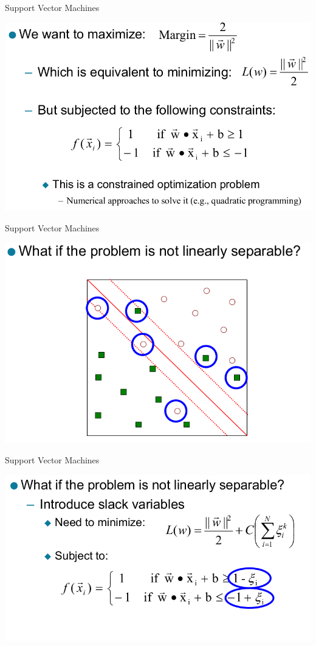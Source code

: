 \documentclass{beamer}
\begin{document}
\begin{frame}{Support Vector Machines}
    \begin{center}
        \includegraphics[scale=0.32]{svm8.png}
    \end{center}
\end{frame}
\begin{frame}{Support Vector Machines}
    \begin{center}
        \includegraphics[scale=0.32]{svm9.png}
    \end{center}
\end{frame}
\begin{frame}{Support Vector Machines}
    \begin{center}
        \includegraphics[scale=0.32]{svm10.png}
    \end{center}
\end{frame}
\end{document}
